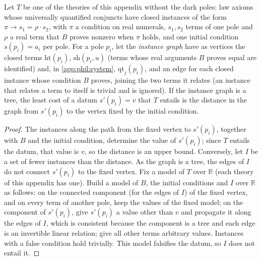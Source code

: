\begin{lemma}\label{lem:phil:star}
Let $T$ be one of the theories of this appendix without the dark poles: law axioms whose universally quantified conjuncts have closed instances of the form $\pi\to s_1=\rho\cdot s_2$, with $\pi$ a condition on real numerals, $s_1,s_2$ terms of one pole and $\rho$ a real term that $B$ proves nonzero when $\pi$ holds, and one initial condition $s(p_i)=a_i$ per pole. For a pole $p_i$, let the \emph{instance graph} have as vertices the closed terms $\mathrm{ht}(p_i)$, $\mathrm{sh}(p_i,u)$ (terms whose real arguments $B$ proves equal are identified) and, in \cref{app:phil:system}, $\mathrm{qt}_j(p_i)$, and an edge for each closed instance whose condition $B$ proves, joining the two terms it relates (an instance that relates a term to itself is trivial and is ignored). If the instance graph is a tree, the least cost of a datum $s'(p_i)=v$ that $T$ entails is the distance in the graph from $s'(p_i)$ to the vertex fixed by the initial condition.
\end{lemma}

\begin{proof}
The instances along the path from the fixed vertex to $s'(p_i)$, together with $B$ and the initial condition, determine the value of $s'(p_i)$; since $T$ entails the datum, that value is $v$, so the distance is an upper bound. Conversely, let $I$ be a set of fewer instances than the distance. As the graph is a tree, the edges of $I$ do not connect $s'(p_i)$ to the fixed vertex. Fix a model of $T$ over $\mathbb R$ (each theory of this appendix has one). Build a model of $B$, the initial conditions and $I$ over $\mathbb R$ as follows: on the connected component (for the edges of $I$) of the fixed vertex, and on every term of another pole, keep the values of the fixed model; on the component of $s'(p_i)$, give $s'(p_i)$ a value other than $v$ and propagate it along the edges of $I$, which is consistent because the component is a tree and each edge is an invertible linear relation; give all other terms arbitrary values. Instances with a false condition hold trivially. This model falsifies the datum, so $I$ does not entail it.
\end{proof}

